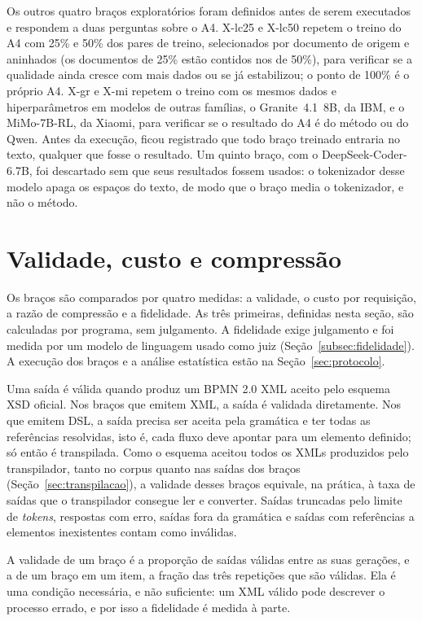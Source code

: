 Os outros quatro braços exploratórios foram definidos antes de serem executados e respondem a duas perguntas sobre o A4. X-lc25 e X-lc50 repetem o treino do A4 com 25\% e 50\% dos pares de treino, selecionados por documento de origem e aninhados (os documentos de 25\% estão contidos nos de 50\%), para verificar se a qualidade ainda cresce com mais dados ou se já estabilizou; o ponto de 100\% é o próprio A4. X-gr e X-mi repetem o treino com os mesmos dados e hiperparâmetros em modelos de outras famílias, o Granite~4.1~8B, da IBM, e o MiMo-7B-RL, da Xiaomi, para verificar se o resultado do A4 é do método ou do Qwen. Antes da execução, ficou registrado que todo braço treinado entraria no texto, qualquer que fosse o resultado. Um quinto braço, com o DeepSeek-Coder-6.7B, foi descartado sem que seus resultados fossem usados: o tokenizador desse modelo apaga os espaços do texto, de modo que o braço media o tokenizador, e não o método.

\section{Validade, custo e compressão}\label{sec:medidas}\label{subsec:validade}\label{subsec:custo}\label{subsec:tcr}

Os braços são comparados por quatro medidas: a validade, o custo por requisição, a razão de compressão e a fidelidade. As três primeiras, definidas nesta seção, são calculadas por programa, sem julgamento. A fidelidade exige julgamento e foi medida por um modelo de linguagem usado como juiz (Seção~\ref{subsec:fidelidade}). A execução dos braços e a análise estatística estão na Seção~\ref{sec:protocolo}.

Uma saída é válida quando produz um BPMN 2.0 XML aceito pelo esquema XSD oficial. Nos braços que emitem XML, a saída é validada diretamente. Nos que emitem DSL, a saída precisa ser aceita pela gramática e ter todas as referências resolvidas, isto é, cada fluxo deve apontar para um elemento definido; só então é transpilada. Como o esquema aceitou todos os XMLs produzidos pelo transpilador, tanto no corpus quanto nas saídas dos braços (Seção~\ref{sec:transpilacao}), a validade desses braços equivale, na prática, à taxa de saídas que o transpilador consegue ler e converter. Saídas truncadas pelo limite de \textit{tokens}, respostas com erro, saídas fora da gramática e saídas com referências a elementos inexistentes contam como inválidas.

A validade de um braço é a proporção de saídas válidas entre as suas gerações, e a de um braço em um item, a fração das três repetições que são válidas. Ela é uma condição necessária, e não suficiente: um XML válido pode descrever o processo errado, e por isso a fidelidade é medida à parte.

